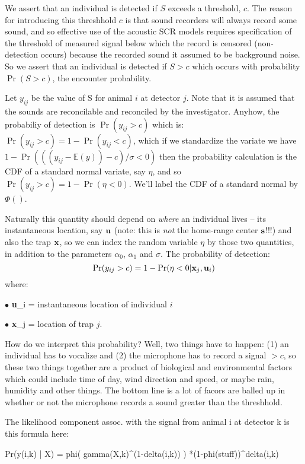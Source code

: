 We assert that an individual is detected if $S$ exceeds a
threshold, $c$. The reason for introducing this threshhold $c$ is that 
sound recorders will always record some sound, and so effective use
of the acoustic SCR models requires specification of the threshold of measured signal below which
the record is censored (non-detection occurs) because the recorded
sound it assumed to be background noise. 
So we assert that an individual is detected if $S>c$ which occurs 
with probability $\Pr(S > c)$, the encounter probability.   

Let $y_{ij}$ be the value of S for animal $i$ at detector $j$. Note that it
is assumed that the sounds are reconcilable and reconciled by the 
investigator. 
Anyhow, the probabiliy of detection is $\Pr(y_{ij}>c)$ which is:
$\Pr(y_{ij}>c) = 1- \Pr(y_{ij} < c)$, which if we standardize the variate 
we have $1-\Pr( ( (y_{ij}- \mathbb{E}(y))- c)/\sigma < 0)$ then the probability
calculation is the CDF  of a standard normal variate, say $\eta$, and so
$\Pr(y_{ij}>c) = 1-\Pr(  \eta < 0 )$. We'll label the CDF of a
standard normal by $\Phi()$.

Naturally this quantity should depend on {\it where} an individual lives
-- its instantaneous location, say ${\bf u}$ (note: this is {\it not}
the home-range center ${\bf s}$!!!) and also the trap ${\bf x}$, so we
can index the random variable $\eta$ by those two quantities, in
addition to the parameters $\alpha_{0}$, $\alpha_{1}$ and $\sigma$. 
The probability of detection:
\[
\Pr(y_{ij} > c) = 1- \Pr( \eta  < 0  | {\bf x}_{j}, {\bf u}_{i} )
\]
where:

$\bullet$ {\bf u}_{i} = instantaneous location of individual $i$

$\bullet$ {\bf x}_{j} = location of trap $j$.

How do we interpret this probability? Well, two things have to happen:
(1)  an individual has to  vocalize and (2) 
 the microphone has to record a signal $>c$, so these two things
 together are a product of biological and environmental factors which
 could include time of day, wind direction and speed, or maybe rain,
 humidity and other things. The bottom line is a lot of facors are
 balled up in whether or not the microphone records a sound greater
 than the threshhold. 

The likelihood component assoc. with the signal from animal i at
detector k is this formula here:

Pr(y(i,k) | X) = phi( gamma(X,k)^(1-delta(i,k)) )
*(1-phi(stuff))^delta(i,k)


